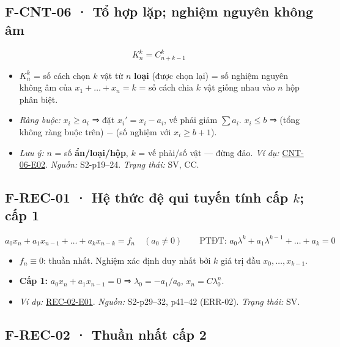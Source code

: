\documentclass[
  10pt,
  twoside,openany]{book}
\providecommand{\tightlist}{%
  \setlength{\itemsep}{0pt}\setlength{\parskip}{0pt}}
\begin{document}
\hypertarget{F-CNT-06}{%
\subsection{F-CNT-06 · Tổ hợp lặp; nghiệm nguyên không
âm}\label{F-CNT-06}}

\[
K_n^k=C_{n+k-1}^{k}
\]

\begin{itemize}
\tightlist
\item
  \(K_n^k\) = số cách chọn \(k\) vật từ \(n\) \textbf{loại} (được chọn
  lại) = số nghiệm nguyên không âm của \(x_1+\dots+x_n=k\) = số cách
  chia \(k\) vật giống nhau vào \(n\) hộp phân biệt.
\item
  \emph{Ràng buộc:} \(x_i\ge a_i\) ⇒ đặt \(x_i'=x_i-a_i\), vế phải giảm
  \(\sum a_i\). \(x_i\le b\) ⇒ (tổng không ràng buộc trên) − (số nghiệm
  với \(x_i\ge b+1\)).
\item
  \emph{Lưu ý:} \(n\) = số \textbf{ẩn/loại/hộp}, \(k\) = vế phải/số vật
  --- đừng đảo. \emph{Ví dụ:}
  \protect\hyperlink{CNT-06-E02}{CNT-06-E02}. \emph{Nguồn:} S2-p19--24.
  \emph{Trạng thái:} SV, CC.
\end{itemize}

\hypertarget{F-REC-01}{%
\subsection{\texorpdfstring{F-REC-01 · Hệ thức đệ qui tuyến tính cấp
\(k\); cấp
1}{F-REC-01 · Hệ thức đệ qui tuyến tính cấp k; cấp 1}}\label{F-REC-01}}

\[
a_0x_n+a_1x_{n-1}+\dots+a_kx_{n-k}=f_n\quad(a_0\ne0)\qquad\text{PTĐT: } a_0\lambda^k+a_1\lambda^{k-1}+\dots+a_k=0
\]

\begin{itemize}
\tightlist
\item
  \(f_n\equiv0\): thuần nhất. Nghiệm xác định duy nhất bởi \(k\) giá trị
  đầu \(x_0,\dots,x_{k-1}\).
\item
  \textbf{Cấp 1:} \(a_0x_n+a_1x_{n-1}=0\) ⇒ \(\lambda_0=-a_1/a_0\),
  \(x_n=C\lambda_0^n\).
\item
  \emph{Ví dụ:} \protect\hyperlink{REC-02-E01}{REC-02-E01}.
  \emph{Nguồn:} S2-p29--32, p41--42 (ERR-02). \emph{Trạng thái:} SV.
\end{itemize}

\hypertarget{F-REC-02}{%
\subsection{F-REC-02 · Thuần nhất cấp 2}\label{F-REC-02}}
\end{document}
